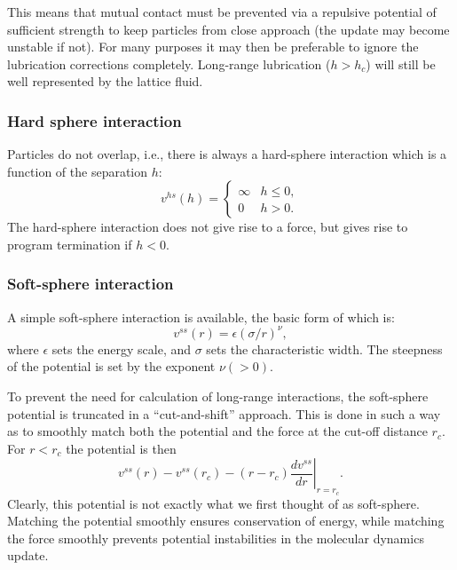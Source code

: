 This means that mutual contact must be prevented
via a repulsive potential of sufficient strength to keep particles
from close approach (the update may become unstable if not). For
many purposes it may then be preferable to ignore the lubrication
corrections completely. Long-range lubrication ($h > h_c$) will
still be well represented by the lattice fluid.


\subsubsection{Hard sphere interaction}

Particles do not overlap, i.e., there is always
a hard-sphere interaction which is a function of the separation $h$:
\begin{equation}
v^{hs}(h) = \left\{
\begin{array}{ll}
\infty & h \leq 0,\\
0   & h > 0.
\end{array} \right.
\end{equation}
The hard-sphere interaction does not give rise to a force, but gives rise
to program termination if $h<0$.


\subsubsection{Soft-sphere interaction}

\label{section-colloids-soft-sphere}

A simple soft-sphere interaction is available, the basic form
of which is:
\begin{equation}
v^{ss}(r) = \epsilon (\sigma / r)^{\nu},
\end{equation}
where $\epsilon$ sets the energy scale, and $\sigma$ sets the
characteristic width. The steepness of the potential is set by
the exponent $\nu (> 0)$.

To prevent the need for calculation of long-range interactions,
the soft-sphere potential is truncated in a ``cut-and-shift''
approach. This is done in such a way as to smoothly match
both the potential and the force at the cut-off distance
$r_c$. For $r < r_c$ the potential is then
\begin{equation}
v^{ss}(r) - v^{ss}(r_c) - (r - r_c) \left.\frac{d v^{ss}}{dr}\right|_{r=r_c}.
\label{eq_ss_shift}
\end{equation}
Clearly, this potential is not exactly what we first thought of as
soft-sphere. Matching the potential smoothly ensures conservation
of energy, while matching the force smoothly prevents potential
instabilities in the molecular dynamics update.

